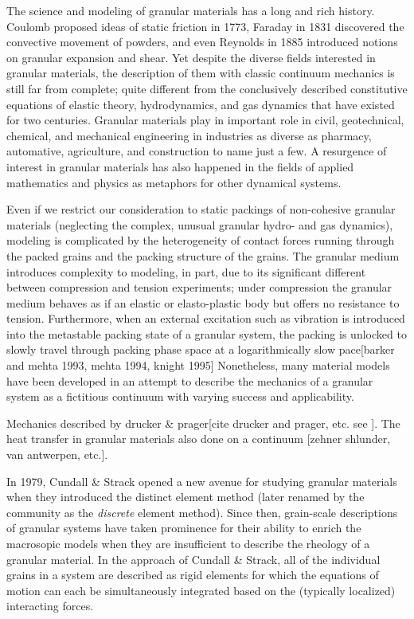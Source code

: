 The science and modeling of granular materials has a long and rich history. Coulomb proposed ideas of static friction in 1773, Faraday in 1831 discovered the convective movement of powders, and even Reynolds in 1885 introduced notions on granular expansion and shear.\cite{Jaeger1996a} Yet despite the diverse fields interested in granular materials, the description of them with classic continuum mechanics is still far from complete; quite different from the conclusively described constitutive equations of elastic theory, hydrodynamics, and gas dynamics that have existed for two centuries.\cite{Sadovskaya2012} Granular materials play in important role in civil, geotechnical, chemical, and mechanical engineering in industries as diverse as pharmacy, automative, agriculture, and construction to name just a few.\cite{Hill} A resurgence of interest in granular materials has also happened in the fields of applied mathematics and physics as metaphors for other dynamical systems.\cite{Jaeger1996a}

Even if we restrict our consideration to static packings of non-cohesive granular materials (neglecting the complex, unusual granular hydro- and gas dynamics), modeling is complicated by the heterogeneity of contact forces running through the packed grains and the packing structure of the grains.  The granular medium introduces complexity to modeling, in part, due to its significant different between compression and tension experiments; under compression the granular medium behaves as if an elastic or elasto-plastic body but offers no resistance to tension. Furthermore, when an external excitation such as vibration is introduced into the metastable packing state of a granular system, the packing is unlocked to slowly travel through packing phase space at a logarithmically slow pace[barker and mehta 1993, mehta 1994, knight 1995] Nonetheless, many material models have been developed in an attempt to describe the mechanics of a granular system as a fictitious continuum with varying success and applicability.

Mechanics described by drucker & prager[cite drucker and prager, etc. see \cite{Hill}]. The heat transfer in granular materials also done on a continuum [zehner shlunder, van antwerpen, etc.]. 

In 1979, Cundall \& Strack opened a new avenue for studying granular materials when they introduced the distinct element method (later renamed by the community as the \textit{discrete} element method).\cite{Cundall1979} Since then, grain-scale descriptions of granular systems have taken prominence for their ability to enrich the macrosopic models when they are insufficient to describe the rheology of a granular material. In the approach of Cundall \& Strack, all of the individual grains in a system are described as rigid elements for which the equations of motion can each be simultaneously integrated based on the (typically localized) interacting forces.

